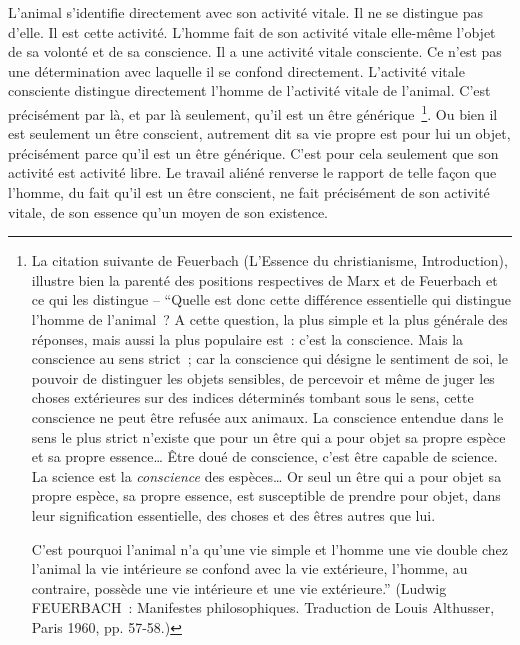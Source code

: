 \documentclass[french,twoside]{book} %
\begin{document}
L’animal s’identifie directement avec son activité vitale. Il ne se distingue pas d’elle. Il est cette activité. L’homme fait de son activité vitale elle-même l’objet de sa volonté et de sa conscience. Il a une activité vitale consciente. Ce n’est pas une détermination avec laquelle il se confond directement. L’activité vitale consciente distingue directement l’homme de l’activité vitale de l’animal. C’est précisément par là, et par là seulement, qu’il est un être générique \footnote{ \noindent La citation suivante de Feuerbach (L’Essence du christianisme, Introduction), illustre bien la parenté des positions respectives de Marx et de Feuerbach et ce qui les distingue – “Quelle est donc cette différence essentielle qui distingue l’homme de l’animal ? A cette question, la plus simple et la plus générale des réponses, mais aussi la plus populaire est : c’est la conscience. Mais la conscience au sens strict ; car la conscience qui désigne le sentiment de soi, le pouvoir de distinguer les objets sensibles, de percevoir et même de juger les choses extérieures sur des indices déterminés tombant sous le sens, cette conscience ne peut être refusée aux animaux. La conscience entendue dans le sens le plus strict n’existe que pour un être qui a pour objet sa propre espèce et sa propre essence… Être doué de conscience, c’est être capable de science. La science est la \emph{conscience} des espèces… Or seul un être qui a pour objet sa propre espèce, sa propre essence, est susceptible de prendre pour objet, dans leur signification essentielle, des choses et des êtres autres que lui.\par
 C’est pourquoi l’animal n’a qu’une vie simple et l’homme une vie double chez l’animal la vie intérieure se confond avec la vie extérieure, l’homme, au contraire, possède une vie intérieure et une vie extérieure.” (Ludwig FEUERBACH : Manifestes philosophiques. Traduction de Louis Althusser, Paris 1960, pp. 57-58.)
}. Ou bien il est seulement un être conscient, autrement dit sa vie propre est pour lui un objet, précisément parce qu’il est un être générique. C’est pour cela seulement que son activité est activité libre. Le travail aliéné renverse le rapport de telle façon que l’homme, du fait qu’il est un être conscient, ne fait précisément de son activité vitale, de son essence qu’un moyen de son existence.\par
\end{document}
